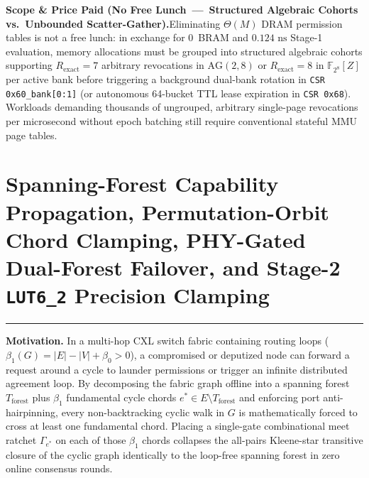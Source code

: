 \documentclass[10pt,twocolumn]{article}
\makeatletter
\newif\ifspecintwocol \specintwocolfalse
\newif\ifspecresume   \specresumefalse
\newcommand{\StopTwoCol}{%
  \if@twocolumn
    \onecolumn
    \global\specintwocolfalse
    \let\spec@next\@empty
  \else
    \ifspecintwocol
      \global\specintwocolfalse
      \def\spec@next{\end{multicols}}%
    \else
      \let\spec@next\@empty
    \fi
  \fi
  \spec@next
}
\newcommand{\BeginConnesPlate}{%
  \if@twocolumn
    \onecolumn
    \global\specresumetrue
    \let\spec@platepre\@empty
  \else
    \ifspecintwocol
      \global\specresumetrue
      \let\spec@platepre\StopTwoCol
    \else
      \global\specresumefalse
      \let\spec@platepre\@empty
    \fi
  \fi
  \spec@platepre
  \par\vspace{4pt}\noindent\textcolor{black!25}{\rule{\textwidth}{0.4pt}}\par\vspace{3pt}%
}
\theoremstyle{spectralthm}
\makeatother
\begin{document}
\par\medskip\noindent\textbf{Scope \& Price Paid (No Free Lunch~---~Structured Algebraic Cohorts vs.\ Unbounded Scatter-Gather).}\;Eliminating $\Theta(M)$ DRAM permission tables is not a free lunch: in exchange for 0~BRAM and $0.124\text{~ns}$ Stage-1 evaluation, memory allocations must be grouped into structured algebraic cohorts supporting $R_{\mathrm{exact}}=7$ arbitrary revocations in $\mathrm{AG}(2,8)$ or $R_{\mathrm{exact}}=8$ in $\mathbb{F}_{2^8}[Z]$ per active bank before triggering a background dual-bank rotation in \texttt{CSR 0x60\_bank[0:1]} (or autonomous 64-bucket TTL lease expiration in \texttt{CSR 0x68}). Workloads demanding thousands of ungrouped, arbitrary single-page revocations per microsecond without epoch batching still require conventional stateful MMU page tables.

\section{Spanning-Forest Capability Propagation, Permutation-Orbit Chord Clamping, PHY-Gated Dual-Forest Failover, and Stage-2 \texorpdfstring{\texttt{LUT6\_2}}{LUT6\_2} Precision Clamping}
\label{sec:forest}

\BeginConnesPlate
\noindent\textbf{Motivation.}\; In a multi-hop CXL switch fabric containing routing loops ($\beta_1(G) = |E| - |V| + \beta_0 > 0$), a compromised or deputized node can forward a request around a cycle to launder permissions or trigger an infinite distributed agreement loop. By decomposing the fabric graph offline into a spanning forest $T_{\mathrm{forest}}$ plus $\beta_1$ fundamental cycle chords $e^* \in E \setminus T_{\mathrm{forest}}$ and enforcing port anti-hairpinning, every non-backtracking cyclic walk in $G$ is mathematically forced to cross at least one fundamental chord. Placing a single-gate combinational meet ratchet $\Gamma_{e^*}$ on each of those $\beta_1$ chords collapses the all-pairs Kleene-star transitive closure of the cyclic graph identically to the loop-free spanning forest in zero online consensus rounds.
\end{document}
